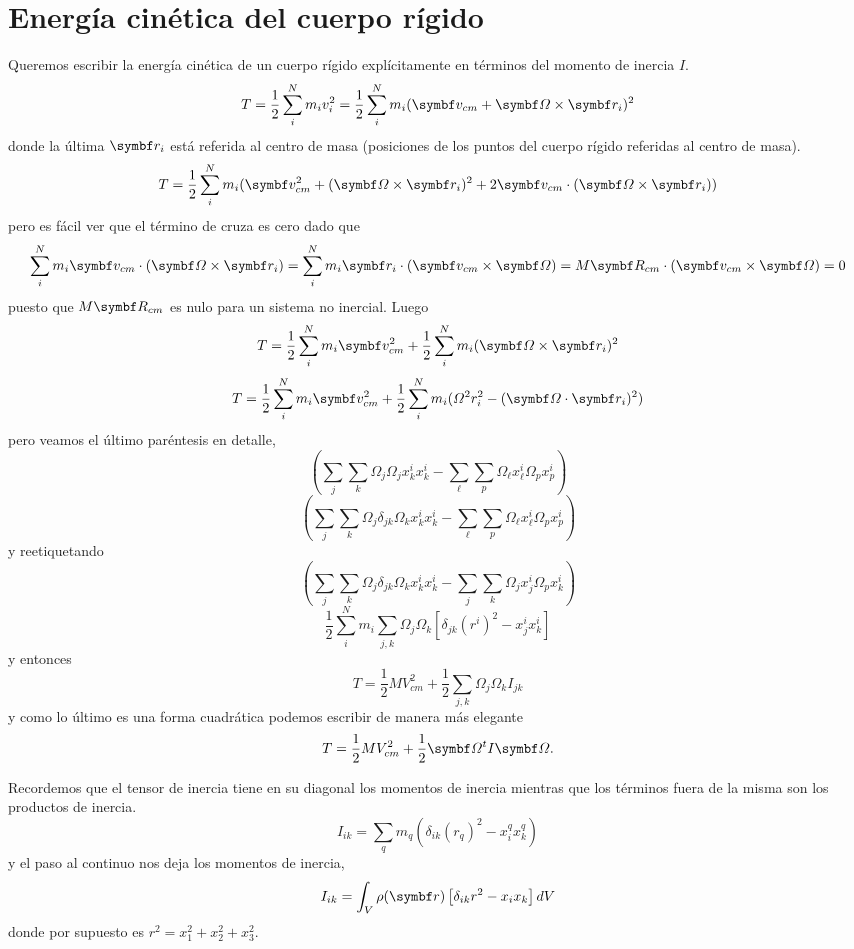 \documentclass[10pt,oneside]{CBFT_book}
\begin{document}
\section{Energía cinética del cuerpo rígido}

Queremos escribir la energía cinética de un cuerpo rígido explícitamente en términos del momento
de inercia $I$.
\[
	T = \frac{1}{2} \sum_i^N m_i v_i^2 = \frac{1}{2} \sum_i^N m_i ( \vb{v}_{cm} + \vb{\Omega} \times \vb{r}_i ) ^2
\]
donde la última $\vb{r}_i$ está referida al centro de masa (posiciones de los puntos del cuerpo
rígido referidas al centro de masa).
\[
	T = \frac{1}{2} \sum_i^N m_i ( \vb{v}_{cm}^2 + (\vb{\Omega} \times \vb{r}_i)^2 +
		2 \vb{v}_{cm} \cdot (\vb{\Omega} \times \vb{r}_i)  )
\]
pero es fácil ver que el término de cruza es cero dado que 
\[
	\sum_i^N m_i \vb{v}_{cm} \cdot (\vb{\Omega} \times \vb{r}_i) = 
	\sum_i^N m_i \vb{r}_i \cdot ( \vb{v}_{cm} \times \vb{\Omega} ) = 
	M \vb{R}_{cm} \cdot ( \vb{v}_{cm} \times \vb{\Omega} ) = 0
\]
puesto que $M \vb{R}_{cm}$ es nulo para un sistema no inercial. Luego 
\[
	T = \frac{1}{2} \sum_i^N m_i \vb{v}_{cm}^2 + \frac{1}{2} \sum_i^N m_i (\vb{\Omega} \times \vb{r}_i)^2
\]
\[
	T = \frac{1}{2} \sum_i^N m_i \vb{v}_{cm}^2 +
	\frac{1}{2} \sum_i^N m_i ( \Omega^2 r_i^2 - (\vb{\Omega}\cdot\vb{r}_i)^2 )
\]
pero veamos el último paréntesis en detalle,
\[
	\left(\sum_j \sum_k \Omega_j \Omega_j x_k^i x_k^i - 
	\sum_\ell \sum_p \Omega_\ell x_\ell^i \Omega_p x_p^i \right)
\]
\[
	\left(\sum_j \sum_k \Omega_j \delta_{jk}\Omega_k x_k^i x_k^i - 
	\sum_\ell \sum_p \Omega_\ell x_\ell^i \Omega_p x_p^i \right)
\]
y reetiquetando
\[
	\left(\sum_j \sum_k \Omega_j \delta_{jk}\Omega_k x_k^i x_k^i - 
	\sum_j \sum_k \Omega_j x_j^i \Omega_p x_k^i \right)
\]
\[
	\frac{1}{2} \sum_i^N m_i \sum_{j,k} \Omega_j\Omega_k \left[ \delta_{jk}(r^i)^2 - x^i_j x^i_k \right]
\]
y entonces
\[
	T = \frac{1}{2} M V^2_{cm} + \frac{1}{2} \sum_{j,k} \Omega_j\Omega_k I_{jk}
\]
y como lo último es una forma cuadrática podemos escribir de manera más elegante
\[
	T = \frac{1}{2} M V^2_{cm} + \frac{1}{2} \vb{\Omega}^t I \vb{\Omega}. 
\]

Recordemos que el tensor de inercia tiene en su diagonal los momentos de inercia
mientras que los términos fuera de la misma son los productos de inercia.
\[
	I_{ik} = \sum_q m_q \left( \delta_{ik} (r_q)^2 - x_i^q x_k^q \right)
\]
y el paso al continuo nos deja los momentos de inercia,
\[
	I_{ik} = \int_V \rho(\vb{r}) \left[ \delta_{ik}r^2 - x_i x_k \right] dV
\]
donde por supuesto es $r^2 = x_1^2 + x_2^2 + x_3^2$.
\end{document}
